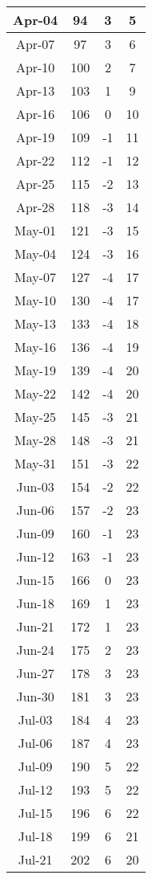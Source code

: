 \begin{longtable}{c | c | c | c}
	Apr-04 & 94 & 3 & 5\\\hline
	Apr-07 & 97 & 3 & 6\\\hline
	Apr-10 & 100 & 2 & 7\\\hline
	Apr-13 & 103 & 1 & 9\\\hline
	Apr-16 & 106 & 0 & 10\\\hline
	Apr-19 & 109 & -1 & 11\\\hline
	Apr-22 & 112 & -1 & 12\\\hline
	Apr-25 & 115 & -2 & 13\\\hline
	Apr-28 & 118 & -3 & 14\\\hline
	May-01 & 121 & -3 & 15\\\hline
	May-04 & 124 & -3 & 16\\\hline
	May-07 & 127 & -4 & 17\\\hline
	May-10 & 130 & -4 & 17\\\hline
	May-13 & 133 & -4 & 18\\\hline
	May-16 & 136 & -4 & 19\\\hline
	May-19 & 139 & -4 & 20\\\hline
	May-22 & 142 & -4 & 20\\\hline
	May-25 & 145 & -3 & 21\\\hline
	May-28 & 148 & -3 & 21\\\hline
	May-31 & 151 & -3 & 22\\\hline
	Jun-03 & 154 & -2 & 22\\\hline
	Jun-06 & 157 & -2 & 23\\\hline
	Jun-09 & 160 & -1 & 23\\\hline
	Jun-12 & 163 & -1 & 23\\\hline
	Jun-15 & 166 & 0 & 23\\\hline
	Jun-18 & 169 & 1 & 23\\\hline
	Jun-21 & 172 & 1 & 23\\\hline
	Jun-24 & 175 & 2 & 23\\\hline
	Jun-27 & 178 & 3 & 23\\\hline
	Jun-30 & 181 & 3 & 23\\\hline
	Jul-03 & 184 & 4 & 23\\\hline
	Jul-06 & 187 & 4 & 23\\\hline
	Jul-09 & 190 & 5 & 22\\\hline
	Jul-12 & 193 & 5 & 22\\\hline
	Jul-15 & 196 & 6 & 22\\\hline
	Jul-18 & 199 & 6 & 21\\\hline
	Jul-21 & 202 & 6 & 20\\\hline

\end{longtable}
